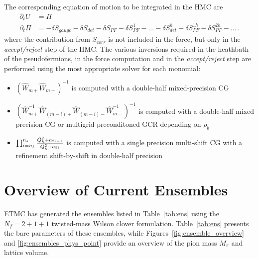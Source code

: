 \documentclass[a4paper,11pt]{article}
\begin{document}
The corresponding equation of motion to be integrated in the HMC are
\begin{align}
  \partial_t U   & =\Pi                \\
  \partial_t \Pi & =-\delta S_{gauge}-
  \delta S_{det} - \delta S_{PF} - \delta S_{PF}^1 -...-
  \delta S^h_{det} -\delta S^{1h}_{PF} - \delta S^{2h}_{PF}-...\,.
\end{align}
where  the contribution from $S_{corr}$ is not included in the force, but only in the \textit{accept/reject} step of the HMC.
The various inversions required in the heathbath of the pseudofermions, in the force computation and in the \textit{accept/reject} step are performed using the most appropriate solver for each monomial:
\begin{itemize}
  \item $(\hat W_{m+}\hat W_{m-})^{-1}$  is computed with a double-half mixed-precision CG
  \item   $(\hat W_{m+}^{-1}\hat W_{(m-i)+}\hat W_{(m-i)-}\hat W_{m-}^{-1})^{-1}$   is computed with a    double-half mixed precision CG or multigrid-preconditoned GCR depending on $\rho_b$
  \item  $\prod_{i=n_\ell}^{n_k} \frac{ \hat{Q}^2_h + a_{2i-1} }{ \hat{Q}^2_h + a_{2i} }$ is computed with a single precision multi-shift CG with a refinement shift-by-shift in double-half precision 
\end{itemize}



\section{Overview of Current Ensembles}

ETMC has generated the ensembles listed in Table~\ref{tab:ens} using the \(N_f = 2+1+1\) twisted-mass Wilson clover formulation. Table~\ref{tab:ens} presents the bare parameters of these ensembles, while Figures~\ref{fig:ensemble_overview} and \ref{fig:ensembles_phys_point} provide an overview of the pion mass \(M_\pi\) and lattice volume.
\end{document}
